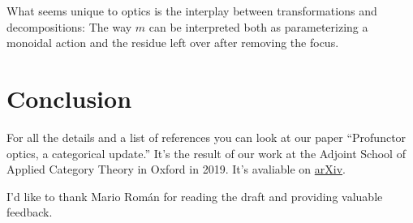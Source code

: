 \documentclass[11pt]{amsart}
\begin{document}
What seems unique to optics is the interplay between transformations and decompositions: The way $m$ can be interpreted both as parameterizing a monoidal action and the residue left over after removing the focus.

\section{Conclusion}

For all the details and a list of references you can look at our paper ``Profunctor optics, a categorical update.'' It's the result of our work at the Adjoint School of Applied Category Theory in Oxford in 2019. It's avaliable on \href{https://arxiv.org/abs/2001.07488}{arXiv}.

I'd like to thank Mario Román for reading the draft and providing valuable feedback.
\end{document}
